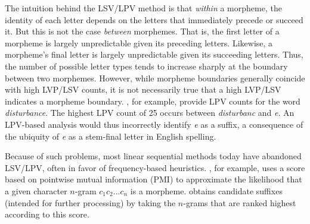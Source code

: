 {%
The intuition behind the LSV/LPV method is that \emph{within} a morpheme, the identity of each letter depends on the letters that immediately precede or succeed it. But this is not the case \emph{between} morphemes. That is, the first letter of a morpheme is largely unpredictable given its preceding letters. Likewise, a morpheme's final letter is largely unpredictable given its succeeding letters. Thus, the number
 of possible letter types tends to increase sharply at the boundary between two morphemes.
However, while morpheme boundaries generally coincide with high LVP/LSV counts, it is not necessarily true that a high LVP/LSV indicates a morpheme boundary.
\cite{hammarstrom:2011}, for example, provide LPV counts for the word \textit{disturbance}. 
The highest LPV count of 25 
occurs between \textit{disturbanc} and \textit{e}.
An LPV-based analysis would thus incorrectly identify \textit{e} as a suffix, a consequence of the ubiquity of \textit{e} as a stem-final letter in English spelling. 

Because of such problems, most linear sequential methods today have abandoned LSV/LPV, often in favor of frequency-based heuristics.
\cite{goldsmith:2001}, for example, uses a score based on pointwise mutual information (PMI) to approximate the likelihood that a given character $n$-gram $c_{1}c_{2}...c_{n}$ is a morpheme. 
\cite{goldsmith:2001} obtains candidate suffixes (intended for further processing) by taking the $n$-grams that are ranked highest according to this score.  

}
